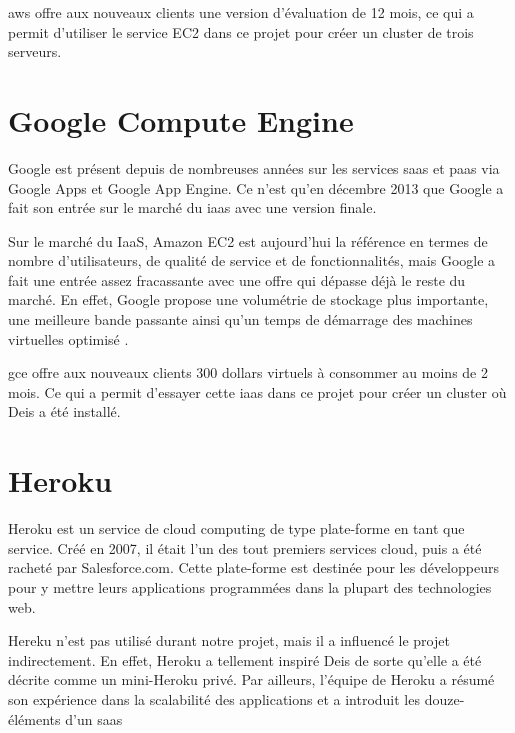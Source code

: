 \acrshort{aws} offre aux nouveaux clients une version d'évaluation de 12 mois, ce qui a permit d'utiliser le service EC2 dans ce projet pour créer un cluster de trois serveurs.

\section*{Google Compute Engine}

Google est présent depuis de nombreuses années sur les services \acrshort{saas} et \acrshort{paas} via Google Apps et Google App Engine. Ce n'est qu'en décembre 2013 que Google a fait son entrée sur le marché du \acrshort{iaas} avec une version finale.

Sur le marché du IaaS, Amazon EC2 est aujourd'hui la référence en termes de nombre d'utilisateurs, de qualité de service et de fonctionnalités, mais Google a fait une entrée assez fracassante avec une offre qui dépasse déjà le reste du marché. En effet, Google propose une volumétrie de stockage plus importante, une meilleure bande passante ainsi qu'un temps de démarrage des machines virtuelles optimisé \cite{gce}.

\acrshort{gce} offre aux nouveaux clients 300 dollars virtuels à consommer au moins de 2 mois. Ce qui a permit d'essayer cette \acrshort{iaas} dans ce projet pour créer un cluster où Deis a été installé.

\section*{Heroku}

Heroku est un service de cloud computing de type plate-forme en tant que service. Créé en 2007, il était l'un des tout premiers services cloud, puis a été racheté par Salesforce.com. Cette plate-forme est destinée pour les développeurs pour y mettre leurs applications programmées dans la plupart des technologies web.

Hereku n'est pas utilisé durant notre projet, mais il a influencé le projet indirectement. En effet, Heroku a tellement inspiré Deis de sorte qu'elle a été décrite comme un mini-Heroku privé. Par ailleurs, l'équipe de Heroku a résumé son expérience dans la scalabilité des applications et a introduit les douze-éléments d'un \acrshort{saas}

